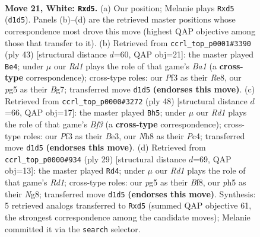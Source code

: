 \documentclass[11pt]{article}
\begin{document}
\clearpage

\begin{figure}[p]\centering
\begin{subfigure}{0.46\textwidth}\centering
\resizebox{\linewidth}{!}{%
\newchessgame
\chessboard[
  setfen={rnk3nN/8/1p6/pB1ppbpp/8/b1p2P1P/P5PR/3RK3 w - - 0 21},
  showmover=false,
  pgfstyle=straightmove, color=movearrow, markmove={d1-d5}
]}
\caption{}
\end{subfigure}\hfill
\begin{subfigure}{0.46\textwidth}\centering
\resizebox{\linewidth}{!}{%
\newchessgame
\chessboard[
  setfen={b3r1k1/p5bp/B2p2p1/2p2p2/5P2/PP6/2PK1BPP/6R1 b - - 1 22},
  showmover=false,
  pgfstyle=straightmove, color=movearrow, markmove={a8-e4}
]}
\caption{}
\end{subfigure}
\\[4pt]
\begin{subfigure}{0.46\textwidth}\centering
\resizebox{\linewidth}{!}{%
\newchessgame
\chessboard[
  setfen={2kr4/1p3p1p/n1pbp3/p4P2/2P5/4BB2/PP4P1/5R1K w - - 1 25},
  showmover=false,
  pgfstyle=straightmove, color=movearrow, markmove={f3-h5}
]}
\caption{}
\end{subfigure}\hfill
\begin{subfigure}{0.46\textwidth}\centering
\resizebox{\linewidth}{!}{%
\newchessgame
\chessboard[
  setfen={3rkbnr/1p3pp1/p3p3/4P2N/6PP/8/PPb2PB1/R1B1K2R b KQk - 0 15},
  showmover=false,
  pgfstyle=straightmove, color=movearrow, markmove={d8-d4}
]}
\caption{}
\end{subfigure}
\caption{\textbf{Move 21, White: \texttt{Rxd5}.} (a) Our position; Melanie plays \texttt{Rxd5} (\texttt{d1d5}). Panels (b)--(d) are the retrieved master positions whose correspondence most drove this move (highest QAP objective among those that transfer to it). (b) Retrieved from \texttt{ccrl\_top\_p0001\#3390} (ply 43) [structural distance $d$=60, QAP obj=21]: the master played \texttt{Be4}; under $\mu$ our \emph{Rd1} plays the role of that game's \emph{Ba1} (a \textbf{cross-type} correspondence); cross-type roles: our \emph{P}f3 as their \emph{R}e8, our \emph{p}g5 as their \emph{B}g7; transferred move \texttt{d1d5} \textbf{(endorses this move)}. (c) Retrieved from \texttt{ccrl\_top\_p0000\#3272} (ply 48) [structural distance $d$=66, QAP obj=17]: the master played \texttt{Bh5}; under $\mu$ our \emph{Rd1} plays the role of that game's \emph{Bf3} (a \textbf{cross-type} correspondence); cross-type roles: our \emph{P}f3 as their \emph{B}e3, our \emph{N}h8 as their \emph{P}c4; transferred move \texttt{d1d5} \textbf{(endorses this move)}. (d) Retrieved from \texttt{ccrl\_top\_p0000\#934} (ply 29) [structural distance $d$=69, QAP obj=13]: the master played \texttt{Rd4}; under $\mu$ our \emph{Rd1} plays the role of that game's \emph{Rd1}; cross-type roles: our \emph{p}g5 as their \emph{B}f8, our \emph{p}h5 as their \emph{N}g8; transferred move \texttt{d1d5} \textbf{(endorses this move)}. Synthesis: 5 retrieved analogs transferred to \texttt{Rxd5} (summed QAP objective 61, the strongest correspondence among the candidate moves); Melanie committed it via the \texttt{search} selector.}
\label{fig:thought-m40}
\end{figure}
\end{document}
